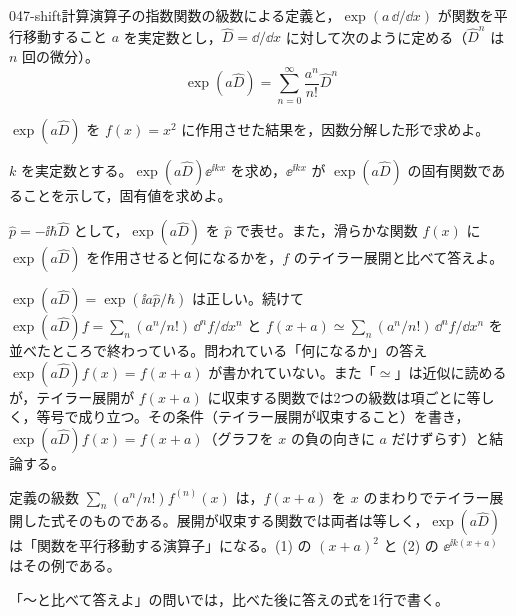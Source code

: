 \documentclass[uplatex,dvipdfmx,a4paper,11pt]{jsarticle}
\begin{document}
\mondaihen
{}
\begin{mondai}{047-shift}{計算}{演算子の指数関数の級数による定義と，$\exp(a\,\dd/\dd x)$ が関数を平行移動すること}
$a$ を実定数とし，$\hat{D}=\dd/\dd x$ に対して次のように定める（$\hat{D}^{n}$ は $n$ 回の微分）。
  \[ \exp(a\hat{D})=\sum_{n=0}^{\infty}\frac{a^{n}}{n!}\hat{D}^{n} \]
  \begin{shoumon}
    \item $\exp(a\hat{D})$ を $f(x)=x^{2}$ に作用させた結果を，因数分解した形で求めよ。
    \item $k$ を実定数とする。$\exp(a\hat{D})\ee^{\ii kx}$ を求め，$\ee^{\ii kx}$ が $\exp(a\hat{D})$ の固有関数であることを示して，固有値を求めよ。
    \item $\hat{p}=-\ii\hbar\hat{D}$ として，$\exp(a\hat{D})$ を $\hat{p}$ で表せ。また，滑らかな関数 $f(x)$ に $\exp(a\hat{D})$ を作用させると何になるかを，$f$ のテイラー展開と比べて答えよ。
  \end{shoumon}

\begin{kotaeran}
   $\exp(a\hat{D})=\exp(\ii a\hat{p}/\hbar)$ は正しい。続けて $\exp(a\hat{D})f=\sum_{n}(a^{n}/n!)\,\dd^{n}f/\dd x^{n}$ と $f(x+a)\simeq\sum_{n}(a^{n}/n!)\,\dd^{n}f/\dd x^{n}$ を並べたところで終わっている。問われている「何になるか」の答え $\exp(a\hat{D})f(x)=f(x+a)$ が書かれていない。また「$\simeq$」は近似に読めるが，テイラー展開が $f(x+a)$ に収束する関数では2つの級数は項ごとに等しく，等号で成り立つ。その条件（テイラー展開が収束すること）を書き，$\exp(a\hat{D})f(x)=f(x+a)$（グラフを $x$ の負の向きに $a$ だけずらす）と結論する。
\end{kotaeran}
\begin{rikai}
  \item 定義の級数 $\sum_{n}(a^{n}/n!)f^{(n)}(x)$ は，$f(x+a)$ を $x$ のまわりでテイラー展開した式そのものである。展開が収束する関数では両者は等しく，$\exp(a\hat{D})$ は「関数を平行移動する演算子」になる。(1) の $(x+a)^{2}$ と (2) の $\ee^{\ii k(x+a)}$ はその例である。
  \item 「〜と比べて答えよ」の問いでは，比べた後に答えの式を1行で書く。
\end{rikai}
\end{mondai}
\end{document}
